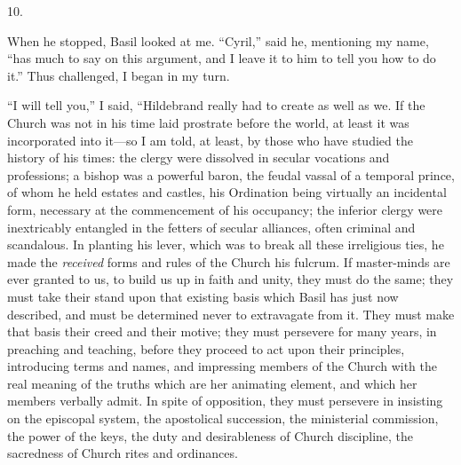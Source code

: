 10.

When he stopped, Basil looked at me. ``Cyril,''
said he, mentioning my name, ``has much to say on this argument, and I
leave it to him to tell you how to do it.'' Thus challenged, I began in
my turn.

``I will tell you,'' I said, ``Hildebrand really had
to create as well as we. If the Church was not in his time laid
prostrate before the world, at least it was incorporated into it—so
I am told, at least, by those who have studied the history of his
times: the clergy were dissolved in secular vocations and professions;
a bishop was a powerful baron, the feudal vassal of a temporal prince,
of whom he held estates and castles, his Ordination being virtually an incidental form, necessary at the commencement of his
occupancy; the inferior clergy were inextricably entangled in the
fetters of secular alliances, often criminal and scandalous. In
planting his lever, which was to break all these irreligious ties, he
made the \emph{received} forms and rules of the Church his fulcrum. If
master-minds are ever granted to us, to build us up in faith and
unity, they must do the same; they must take their stand upon that
existing basis which Basil has just now described, and must be
determined never to extravagate from it. They must make that basis
their creed and their motive; they must persevere for many years, in
preaching and teaching, before they proceed to act upon their
principles, introducing terms and names, and impressing members of the
Church with the real meaning of the truths which are her animating
element, and which her members verbally admit. In spite of opposition,
they must persevere in insisting on the episcopal system, the
apostolical succession, the ministerial commission, the power of the
keys, the duty and desirableness of Church discipline, the sacredness
of Church rites and ordinances.

